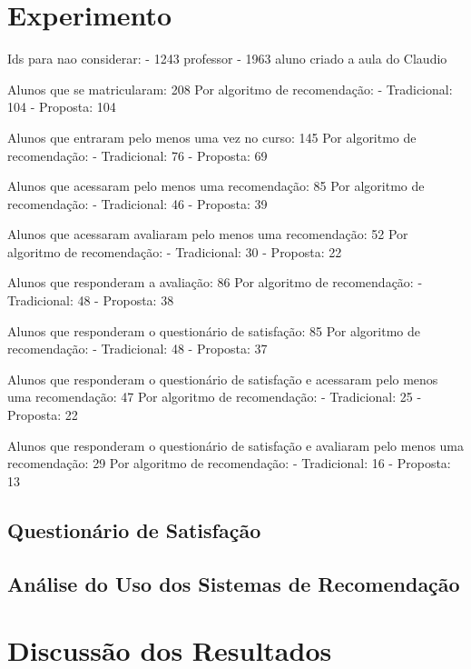\section{Experimento}\label{section:resultados-experimento}

Ids para nao considerar:
- 1243 professor
- 1963 aluno criado a aula do Claudio

Alunos que se matricularam: 208
Por algoritmo de recomendação:
- Tradicional: 104
- Proposta: 104


Alunos que entraram pelo menos uma vez no curso: 145
Por algoritmo de recomendação:
- Tradicional: 76
- Proposta: 69

Alunos que acessaram pelo menos uma recomendação: 85
Por algoritmo de recomendação:
- Tradicional: 46
- Proposta: 39

Alunos que acessaram avaliaram pelo menos uma recomendação: 52
Por algoritmo de recomendação:
- Tradicional: 30
- Proposta: 22

Alunos que responderam a avaliação: 86
Por algoritmo de recomendação:
- Tradicional: 48
- Proposta: 38

Alunos que responderam o questionário de satisfação: 85
Por algoritmo de recomendação:
- Tradicional: 48
- Proposta: 37

Alunos que responderam o questionário de satisfação e acessaram pelo menos uma recomendação: 47
Por algoritmo de recomendação:
- Tradicional: 25
- Proposta: 22

Alunos que responderam o questionário de satisfação e avaliaram pelo menos uma recomendação: 29
Por algoritmo de recomendação:
- Tradicional: 16
- Proposta: 13


\subsection{Questionário de Satisfação}

\lipsum[1]

\subsection{Análise do Uso dos Sistemas de Recomendação}

\lipsum[1]

\section{Discussão dos Resultados}

\lipsum[1]